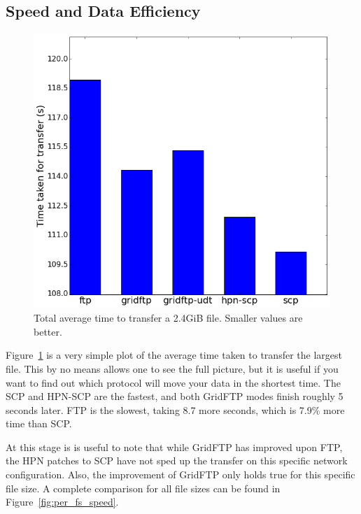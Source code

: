 \documentclass{sig-alternate-05-2015}
\begin{document}
\subsection{Speed and Data Efficiency}
\begin{figure}
\centering
	\includegraphics[width=.8\linewidth]{img/time.png}
\caption{Total average time to transfer a 2.4GiB file. Smaller values are better.}
\label{fig:time}
\end{figure}

Figure~\ref{fig:time} is a very simple plot of the average time taken to transfer the largest file. This by no means allows one to see the full picture, but it is useful if you want to find out which protocol will move your data in the shortest time. The SCP and HPN-SCP are the fastest, and both GridFTP modes finish roughly 5 seconds later. FTP is the slowest, taking 8.7 more seconds, which is 7.9\% more time than SCP.

At this stage is is useful to note that while GridFTP has improved upon FTP, the HPN patches to SCP have not sped up the transfer on this specific network configuration. Also, the improvement of GridFTP only holds true for this specific file size. A complete comparison for all file sizes can be found in Figure~\ref{fig:per_fs_speed}.
\end{document}
